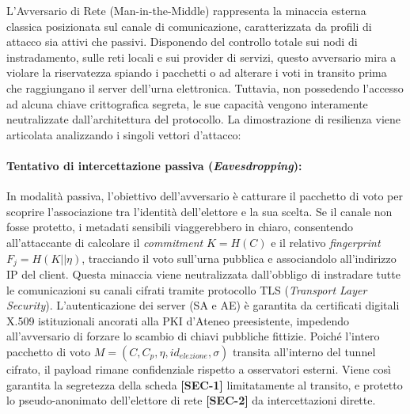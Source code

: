 L'Avversario di Rete (Man-in-the-Middle) rappresenta la minaccia esterna classica posizionata sul canale di comunicazione, caratterizzata da profili di attacco sia attivi che passivi. Disponendo del controllo totale sui nodi di instradamento, sulle reti locali e sui provider di servizi, questo avversario mira a violare la riservatezza spiando i pacchetti o ad alterare i voti in transito prima che raggiungano il server dell'urna elettronica. Tuttavia, non possedendo l'accesso ad alcuna chiave crittografica segreta, le sue capacità vengono interamente neutralizzate dall'architettura del protocollo. La dimostrazione di resilienza viene articolata analizzando i singoli vettori d'attacco:

\paragraph{Tentativo di intercettazione passiva (\textit{Eavesdropping}):} In modalità passiva, l'obiettivo dell'avversario è catturare il pacchetto di voto per scoprire l'associazione tra l'identità dell'elettore e la sua scelta. Se il canale non fosse protetto, i metadati sensibili viaggerebbero in chiaro, consentendo all'attaccante di calcolare il \textit{commitment} $K=H(C)$ e il relativo \textit{fingerprint} $F_j=H(K||\eta)$, tracciando il voto sull'urna pubblica e associandolo all'indirizzo IP del client. Questa minaccia viene neutralizzata dall'obbligo di instradare tutte le comunicazioni su canali cifrati tramite protocollo TLS (\textit{Transport Layer Security}). L'autenticazione dei server (SA e AE) è garantita da certificati digitali X.509 istituzionali ancorati alla PKI d'Ateneo preesistente, impedendo all'avversario di forzare lo scambio di chiavi pubbliche fittizie. Poiché l'intero pacchetto di voto $M=(C,C_p,\eta,id_{elezione},\sigma)$ transita all'interno del tunnel cifrato, il payload rimane confidenziale rispetto a osservatori esterni. Viene così garantita la segretezza della scheda \textbf{[SEC-1]} limitatamente al transito, e protetto lo pseudo-anonimato dell'elettore di rete \textbf{[SEC-2]} da intercettazioni dirette.

